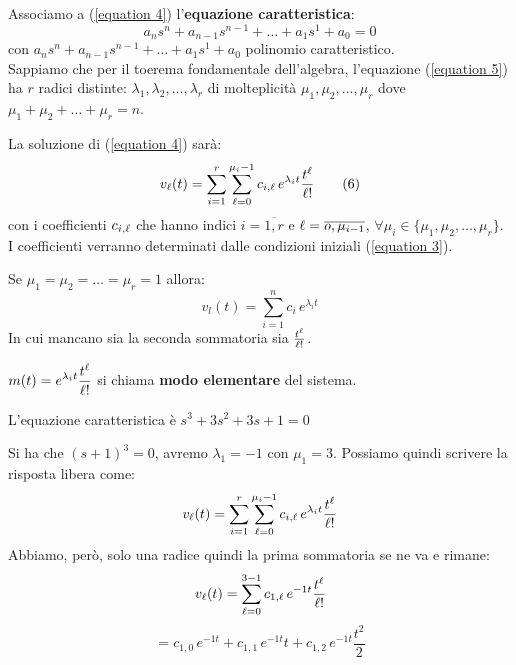 	Associamo a (\ref{equation 4}) l'\textbf{equazione caratteristica}:
	\begin{equation}
		a_n s^n 
		+ a_{n-1} s^{n-1}
		+ \dots
		+ a_1 s^1
		+ a_0 = 0
		\tag{5}\label{equation 5}
	\end{equation}
	con $a_n s^n + a_{n-1} s^{n-1} + \dots + a_1 s^1 + a_0 $ polinomio caratteristico.\\

	Sappiamo che per il toerema fondamentale dell'algebra, l'equazione (\ref{equation 5}) ha $r$ radici  distinte: $\lambda_1,\lambda_2, \dots, \lambda_r$ di molteplicità $\mu_1, \mu_2, \dots,\mu_r$ dove  $\mu_1 +\mu_2 + \dots + \mu_r = n$.
	
	La soluzione di (\ref{equation 4}) sarà:
	\begin{equation}
		v_\ell(t)=  \sum_{i=1}^{r}\sum_{\ell=0}^{\mu_i-1}c_{i,\ell} \,e^{\lambda_it}\frac{t^\ell}{\ell!}
		\tag{6}\label{equation 6}
	\end{equation}
	con i coefficienti $c_{i,\ell} $ che hanno indici $ i=\overline{1,r} $ e $ \ell=\overline{o,\mu_{i-1}}$, $ \forall\mu_i \in \{\mu_1,\mu_2,\dots,\mu_r\} $. I coefficienti verranno determinati dalle condizioni iniziali (\ref{equation 3}).
		
	\begin{osservazione}
		Se $\mu_1 = \mu_2 = \dots = \mu_r = 1$ allora:
		\begin{equation*}
			v_l(t)=  \sum_{i=1}^{n}c_{i} \,e^{\lambda_it}
		\end{equation*}
		In cui mancano sia la seconda sommatoria sia $ \frac{t^\ell}{\ell!}$.
	\end{osservazione}
	
	\begin{definizione}
		$\displaystyle m(t) = e^{\lambda_i t} \frac{t^\ell}{\ell!} $ si chiama \textbf{modo elementare} del sistema.
	\end{definizione}
	\begin{nexample}
	L'equazione caratteristica è $ s^3 + 3 s^2 + 3s +1=0$
	
	Si ha che $ (s+1)^3=0$, avremo $ \lambda_{1} = -1$ con $ \mu_1=3 $. 
	Possiamo quindi scrivere la risposta libera come:
	\[ v_\ell(t) =\sum_{i=1}^{r}\sum_{\ell=0}^{\mu_i-1}c_{i,\ell} \,e^{\lambda_it}\frac{t^\ell}{\ell!} \]
	Abbiamo, però, solo una radice quindi la prima sommatoria se ne va e rimane:
	 \[ v_\ell(t) =\sum_{\ell=0}^{3-1}c_{1,\ell} \,e^{-1 t}\frac{t^\ell}{\ell!}  \]
	 \[ = c_{1,0} \, e^{-1t} + c_{1,1}\, e^{-1t} t + c_{1,2}\, e^{-1t} \frac{t^2}{2} \]
	\end{nexample}
	
